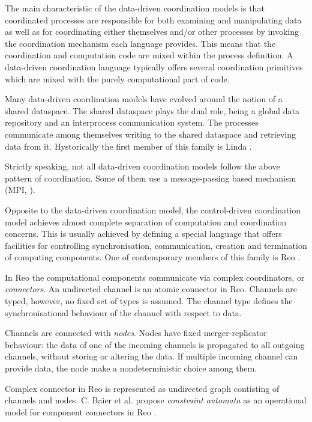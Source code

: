 The main characteristic of the data-driven coordination models is that coordinated processes are responsible for both examining and manipulating data as well as for coordinating either themselves and/or other processes by invoking the coordination mechanism each language provides. This means that the coordination and computation code are mixed within the process definition. A data-driven coordination language typically offers several coordination primitives which are mixed with the purely computational part of code.

Many data-driven coordination models have evolved around the notion of a shared dataspace. The shared dataspace plays the dual role, being a global data repository and an interprocess communication system. The processes communicate among themselves writing to the shared dataspace and retrieving data from it. Hystorically the first member of this family is Linda \cite{linda}.

Strictly speaking, not all data-driven coordination models follow the above pattern of coordination. Some of them use a message-passing based mechanism (MPI, \cite{mpi}).

Opposite to the data-driven coordination model, the control-driven coordination model achieves almost complete separation of computation and coordination concerns. This is usually achieved by defining a special language that offers facilities for controlling synchronisation, communication, creation and termination of computing components. One of contemporary members of this family is Reo \cite{Reo_Arbab04}.

In Reo the computational components communicate via complex coordinators, or \emph{connectors}. An undirected channel is an atomic connector in Reo. Channels are typed, however, no fixed set of types is assumed. The channel type defines the synchronisational behaviour of the channel with respect to data.

Channels are connected with \emph{nodes}. Nodes have fixed merger-replicator behaviour: the data of one of the incoming channels is propagated to all outgoing channels, without storing or altering the data. If multiple incoming channel can provide data, the node make a nondeterministic choice among them.

Complex connector in Reo is represented as undirected graph contisting of channels and nodes. C. Baier et al. propose \emph{constraint automata} as an operational model for component connectors in Reo \cite{baier_ca}.


